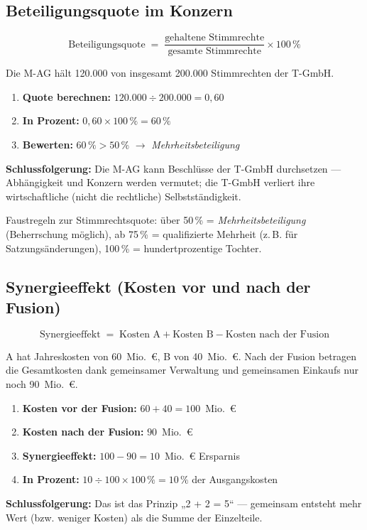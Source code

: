 \documentclass[11pt, a4paper]{article}
\begin{document}
\subsection{Beteiligungsquote im Konzern}

\[
\textrm{Beteiligungsquote} \;=\; \frac{\textrm{gehaltene Stimmrechte}}{\textrm{gesamte Stimmrechte}} \times 100\,\%
\]

\begin{beispiel}[title={Rechenbeispiel: Mehrheitsbeteiligung}]
Die M-AG hält 120.000 von insgesamt 200.000 Stimmrechten der T-GmbH.
\begin{enumerate}
  \item \textbf{Quote berechnen:} $120.000 \div 200.000 = 0{,}60$
  \item \textbf{In Prozent:} $0{,}60 \times 100\,\% = 60\,\%$
  \item \textbf{Bewerten:} $60\,\% > 50\,\%$ $\rightarrow$ \emph{Mehrheitsbeteiligung}
\end{enumerate}
\textbf{Schlussfolgerung:} Die M-AG kann Beschlüsse der T-GmbH durchsetzen ---
Abhängigkeit und Konzern werden vermutet; die T-GmbH verliert ihre wirtschaftliche
(nicht die rechtliche) Selbstständigkeit.
\end{beispiel}

\begin{merksatz}
Faustregeln zur Stimmrechtsquote: über 50\,\% = \emph{Mehrheitsbeteiligung}
(Beherrschung möglich), ab 75\,\% = qualifizierte Mehrheit (z.\,B. für
Satzungsänderungen), 100\,\% = hundertprozentige Tochter.
\end{merksatz}

\subsection{Synergieeffekt (Kosten vor und nach der Fusion)}

\[
\textrm{Synergieeffekt} \;=\; \textrm{Kosten A} + \textrm{Kosten B} - \textrm{Kosten nach der Fusion}
\]

\begin{beispiel}[title={Rechenbeispiel: Kostensynergie}]
A hat Jahreskosten von 60~Mio.~€, B von 40~Mio.~€. Nach der Fusion betragen die
Gesamtkosten dank gemeinsamer Verwaltung und gemeinsamen Einkaufs nur noch 90~Mio.~€.
\begin{enumerate}
  \item \textbf{Kosten vor der Fusion:} $60 + 40 = 100$~Mio.~€
  \item \textbf{Kosten nach der Fusion:} $90$~Mio.~€
  \item \textbf{Synergieeffekt:} $100 - 90 = 10$~Mio.~€ Ersparnis
  \item \textbf{In Prozent:} $10 \div 100 \times 100\,\% = 10\,\%$ der Ausgangskosten
\end{enumerate}
\textbf{Schlussfolgerung:} Das ist das Prinzip „2 + 2 = 5`` --- gemeinsam entsteht mehr
Wert (bzw. weniger Kosten) als die Summe der Einzelteile.
\end{beispiel}
\end{document}

